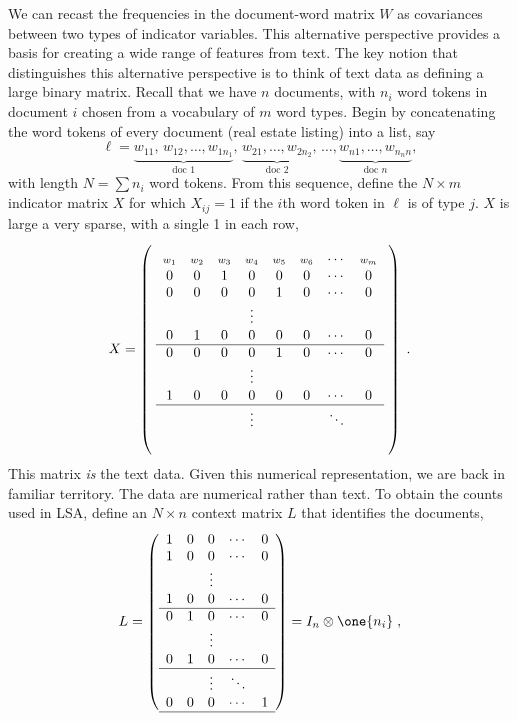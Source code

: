 \documentclass[12pt]{article}
\begin{document}
We can recast the frequencies in the document-word matrix $W$ as covariances between two types of indicator variables. This alternative perspective provides a basis for creating a wide range of features from text.  The key notion that distinguishes this alternative perspective is to think of text data as defining a large binary matrix.  Recall that we have $n$ documents, with $n_i$ word tokens in document $i$ chosen from a vocabulary of $m$ word types.  Begin by concatenating the word tokens of every document (real estate listing) into a list, say
\begin{equation*}
   \ell = \underbrace{w_{11},\,w_{12},\ldots,w_{1n_1}}_{\mbox{doc 1}},\,
            \underbrace{w_{21},\ldots,w_{2n_2}}_{\mbox{doc 2}}, \,
            \ldots, \underbrace{w_{n1},\ldots,w_{n_nn}}_{\mbox{doc }n},
\end{equation*}
with length $N = \sum n_i$ word tokens.  From this sequence, define the $N \times m$ indicator matrix $X$ for which $X_{ij} = 1$ if the $i$th word token in $\ell$ is of type $j$.  $X$ is large a very sparse, with a single 1 in each row, 
\begin{equation}
  X =   \left( \rule{0em}{8em} \right.
  \begin{array}{cccccccc}
            \mbox{\scriptsize $w_1$} &
            \mbox{\scriptsize $w_2$} &
            \mbox{\scriptsize $w_3$} &
            \mbox{\scriptsize $w_4$} &
            \mbox{\scriptsize $w_5$} &
            \mbox{\scriptsize $w_6$} &   \cdots &
            \mbox{\scriptsize $w_m$}  \cr
            0  & 0 & 1 & 0 & 0 & 0 & \cdots & 0 \cr
            0  & 0  & 0 & 0 & 1 & 0 & \cdots & 0 \cr
             &&&  \vdots &&&&                                 \cr
            0  & 1  & 0 & 0 & 0 & 0 & \cdots & 0 \cr \hline
            0  & 0 & 0 & 0 & 1 & 0 & \cdots & 0 \cr
              &&&  \vdots &&&&                                 \cr
            1  & 0 & 0 & 0 & 0 & 0 & \cdots & 0 \cr \hline
              &&&  \vdots &&&\ddots&                                 \cr
              \\
           \end{array}
        \left. \rule{0em}{8em} \right)
        \;.
\end{equation}
This matrix {\em is} the text data.  Given this numerical representation, we are back in familiar territory.  The data are numerical rather than text.  To obtain the counts used in LSA, define an $N \times n$ context matrix $L$  that identifies the documents,
\begin{equation}
  L =  \left(  
           \begin{array}{ccccc}
            1  & 0 & 0 & \cdots & 0 \cr
            1  & 0 & 0 & \cdots & 0 \cr
             &&  \vdots &&                       \cr
            1 & 0 &  0 & \cdots & 0 \cr \hline
            0 & 1 & 0  & \cdots & 0 \cr
              &&  \vdots &&                        \cr
            0 & 1& 0 & \cdots & 0 \cr \hline
              &&  \vdots  &\ddots&             \cr
            0 & 0& 0 & \cdots & 1 \cr \hline        
           \end{array}
         \right) = I_n \otimes \one{n_i}  \;,
\end{equation}
\end{document}
